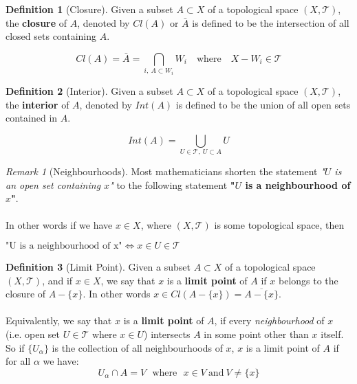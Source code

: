 \documentclass{article}
\theoremstyle{remark}
\newtheorem*{remark}{Remark}
\theoremstyle{definition}
\newtheorem{definition}{Definition}[section]
\begin{document}
\medskip

\begin{definition}[Closure]
Given a subset $A \subset X$ of a topological space $(X , \mathcal{T})$, the \textbf{closure} of $A$, denoted by $Cl(A)$ or $\bar{A}$ is defined to be the intersection of all closed sets containing $A$.

$$Cl(A) = \bar{A} = \bigcap_{i , \  A \subset W_i} W_i \ \ \ \text{ where } \ \ \ X - W_i \in \mathcal{T}$$

\end{definition}

\begin{definition}[Interior]
Given a subset $A \subset X$ of a topological space $(X , \mathcal{T})$, the \textbf{interior} of $A$, denoted by $Int(A)$ is defined to be the union of all open sets contained in $A$.

$$Int(A) = \bigcup_{U \in \mathcal{T} , \  U \subset A} U $$

\end{definition}

\medskip

\begin{remark}[Neighbourhoods]
Most mathematicians shorten the statement \textit{"$U$ is an open set containing $x$"} to the following statement \textbf{"$U$ is a neighbourhood of $x$"}.
\\ \\
In other words if we have $x \in X$, where $(X, \mathcal{T})$ is some topological space, then 
\begin{center}
$\text{"U \ is \ a \ neighbourhood \ of \ x"} \iff x \in U \in \mathcal{T}$ 
\end{center}
\end{remark}

\medskip

\newpage

\begin{definition}[Limit Point]
Given a subset $A \subset X$ of a topological space $(X , \mathcal{T})$, and if $x \in X$, we say that $x$ is a \textbf{limit point} of $A$ if $x$ belongs to the closure of $A - \{x\}$. In other words $x \in Cl\left(A - \{x\}\right) = \overline{A - \{x\}}$.
\\ \\
Equivalently, we say that $x$ is a \textbf{limit point} of $A$, if every \textit{neighbourhood} of $x$ (i.e. open set $U \in \mathcal{T}$ where $x \in U$) intersects $A$ in some point other than $x$ itself. \\
So if $\{U_{\alpha}\}$ is the collection of all neighbourhoods of $x$, $x$ is a limit point of $A$ if for all $\alpha$ we have: $$U_{\alpha} \cap A = V \ \ \ \text{where} \ \ \ x \in V \  \text{and} \  V \neq \{x\}$$
\end{definition}
\end{document}
